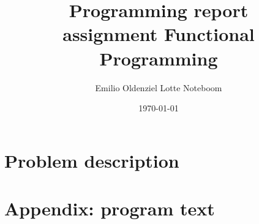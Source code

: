 \documentclass[a4paper]{article}
\begin{document}
\title{Programming report\\
       assignment Functional Programming
}
\date{\today}
\author{Emilio Oldenziel \quad  Lotte Noteboom}

\maketitle

\section{Problem description}


\newpage
\section{Appendix: program text}

\end{document}
